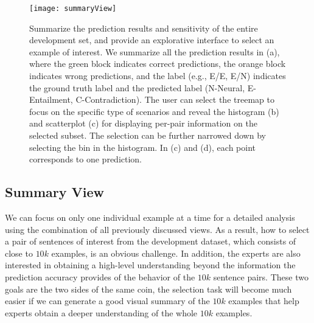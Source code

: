 \begin{figure}[htbp]
\centering
\vspace{-2mm}
 \texttt{[image: summaryView]}
 \vspace{-6mm}
 \caption{
Summarize the prediction results and sensitivity of the entire development set, and provide an explorative interface to select an example of interest.
We summarize all the prediction results in (a), where the green block indicates correct predictions, the orange block indicates wrong predictions, and the label (e.g., E/E, E/N) indicates the ground truth label and the predicted label (N-Neural, E-Entailment, C-Contradiction).
%
The user can select the treemap to focus on the specific type of scenarios and reveal the histogram (b) and scatterplot (c) for displaying per-pair information on the selected subset.
The selection can be further narrowed down by selecting the bin in the histogram.
In (c) and (d), each point corresponds to one prediction.
 }
 \vspace{-2mm}
\label{fig:summaryView}
\end{figure}

\subsection{Summary View}
\label{sec:allPairs}
We can focus on only one individual example at a time for a detailed analysis using the combination of all previously discussed views. As a result, how to select a pair of sentences of interest from the development dataset, which consists of close to $10k$ examples, is an obvious challenge.
In addition, the experts are also interested in obtaining a high-level understanding beyond the information the prediction accuracy provides of the behavior of the $10k$ sentence pairs.
%
These two goals are the two sides of the same coin, the selection task will become much easier if we can generate a good visual summary of the $10k$ examples that help experts obtain a deeper understanding of the whole $10k$ examples.

